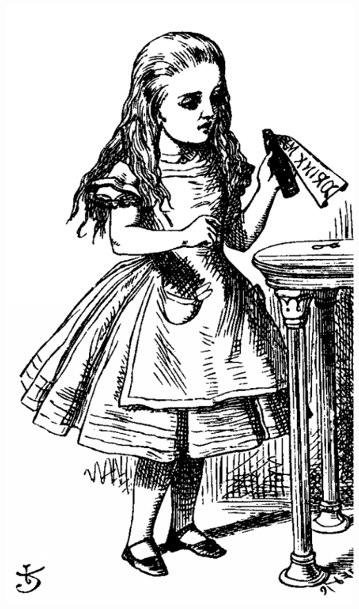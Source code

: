\documentclass[12pt]{article}
\begin{document}
				\begin{minipage}{0.6\linewidth}
					\includegraphics[width=\linewidth]{4.png}
				\end{minipage}
			
				
	
\end{document}

